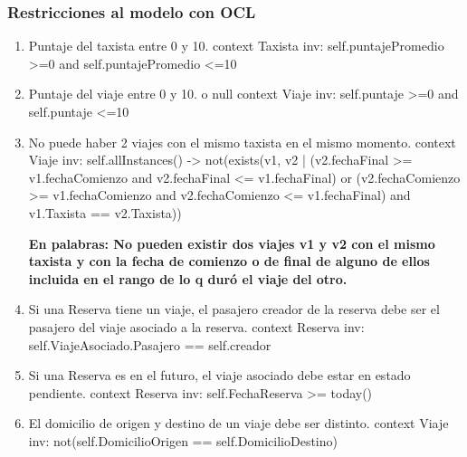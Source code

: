 \subsubsection{Restricciones al modelo con OCL}
\begin{enumerate}
	\item \begin{ocl}{Puntaje del taxista entre 0 y 10.}
		  context Taxista
		  inv: self.puntajePromedio >=0 and
		       self.puntajePromedio <=10
		\end{ocl}
	
	\item \begin{ocl}{Puntaje del viaje entre 0 y 10. o null}
		  context Viaje
		  inv: self.puntaje >=0 and
		       self.puntaje <=10
		\end{ocl}

	\item \begin{ocl}{No puede haber 2 viajes con el mismo taxista en el mismo momento.}
		  context Viaje
		  inv: self.allInstances() -> not(exists(v1, v2 | 
		     (v2.fechaFinal >= v1.fechaComienzo and v2.fechaFinal <= v1.fechaFinal) or 
		     (v2.fechaComienzo >= v1.fechaComienzo and v2.fechaComienzo <= v1.fechaFinal)
		     and v1.Taxista == v2.Taxista))
		\end{ocl}
		\textbf{En palabras: No pueden existir dos viajes v1 y v2 con el mismo taxista y con la fecha de comienzo o de final de alguno de ellos incluida en el rango de lo q duró el viaje del otro.}

	\item \begin{ocl}{Si una Reserva tiene un viaje, el pasajero creador de la reserva debe ser el pasajero del viaje asociado a la reserva.}
		  context Reserva
		  inv: self.ViajeAsociado.Pasajero == self.creador
		\end{ocl}

	\item \begin{ocl}{Si una Reserva es en el futuro, el viaje asociado debe estar en estado pendiente.}
		  context Reserva
		  inv: self.FechaReserva >= today()
		\end{ocl}

	\item \begin{ocl}{El domicilio de origen y destino de un viaje debe ser distinto.}
		  context Viaje
		  inv: not(self.DomicilioOrigen == self.DomicilioDestino)
		\end{ocl}


\end{enumerate}
